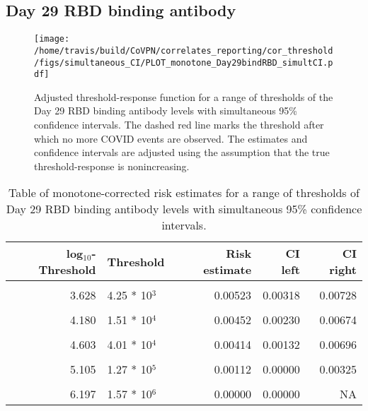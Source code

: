 \documentclass[]{book}
\theoremstyle{definition}
\theoremstyle{definition}
\theoremstyle{definition}
\newcommand{\1}{\mathbbm{1}}
\begin{document}
\clearpage

\clearpage

\clearpage

\hypertarget{day-29-rbd-binding-antibody-3}{%
\subsection{Day 29 RBD binding antibody}\label{day-29-rbd-binding-antibody-3}}

\begin{figure}[H]
\centering
\texttt{[image: /home/travis/build/CoVPN/correlates\_reporting/cor\_threshold/figs/simultaneous\_CI/PLOT\_monotone\_Day29bindRBD\_simultCI.pdf]}
\caption{Adjusted threshold-response function for a range of thresholds of the
  Day 29 RBD binding antibody levels with simultaneous 95\% confidence intervals. The dashed red line marks the threshold after which no more COVID events are observed. The estimates and confidence intervals are adjusted using the assumption that the true threshold-response is nonincreasing.}
\end{figure}
\begin{table}[!h]

\caption{\label{tab:unnamed-chunk-405}Table of monotone-corrected risk estimates for a range of thresholds of Day 29 RBD binding antibody levels with simultaneous 95\% confidence intervals.}
\centering
\begin{tabular}[t]{rlrrr}
\toprule
log$_{10}$-Threshold & Threshold & Risk estimate & CI left & CI right\\
\midrule
\cellcolor{gray!6}{2.882} & \cellcolor{gray!6}{7.62 * 10$^2$} & \cellcolor{gray!6}{0.00576} & \cellcolor{gray!6}{0.00374} & \cellcolor{gray!6}{0.00779}\\
3.628 & 4.25 * 10$^3$ & 0.00523 & 0.00318 & 0.00728\\
\cellcolor{gray!6}{3.889} & \cellcolor{gray!6}{7.74 * 10$^3$} & \cellcolor{gray!6}{0.00459} & \cellcolor{gray!6}{0.00255} & \cellcolor{gray!6}{0.00663}\\
4.180 & 1.51 * 10$^4$ & 0.00452 & 0.00230 & 0.00674\\
\cellcolor{gray!6}{4.395} & \cellcolor{gray!6}{2.48 * 10$^4$} & \cellcolor{gray!6}{0.00452} & \cellcolor{gray!6}{0.00183} & \cellcolor{gray!6}{0.00721}\\
4.603 & 4.01 * 10$^4$ & 0.00414 & 0.00132 & 0.00696\\
\cellcolor{gray!6}{4.826} & \cellcolor{gray!6}{6.70 * 10$^4$} & \cellcolor{gray!6}{0.00365} & \cellcolor{gray!6}{0.00054} & \cellcolor{gray!6}{0.00676}\\
5.105 & 1.27 * 10$^5$ & 0.00112 & 0.00000 & 0.00325\\
\cellcolor{gray!6}{5.422} & \cellcolor{gray!6}{2.64 * 10$^5$} & \cellcolor{gray!6}{0.00112} & \cellcolor{gray!6}{0.00000} & \cellcolor{gray!6}{0.00400}\\
6.197 & 1.57 * 10$^6$ & 0.00000 & 0.00000 & NA\\
\bottomrule
\end{tabular}
\end{table}
\end{document}
